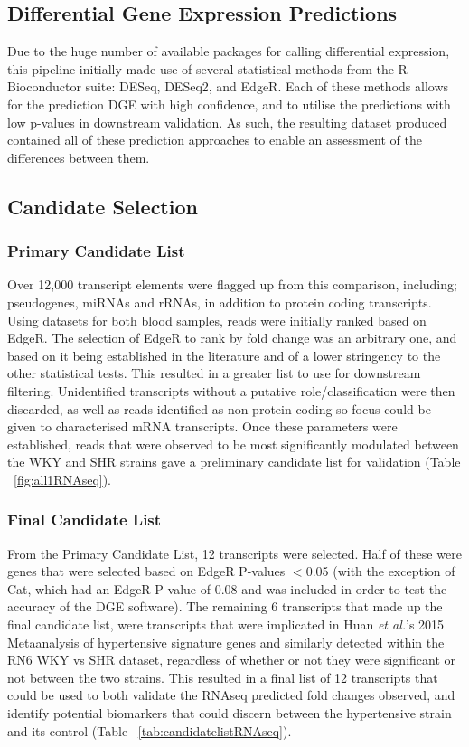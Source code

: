 \subsection{Differential Gene Expression Predictions}
Due to the huge number of available packages for calling differential expression, this pipeline initially made use of several statistical methods from the R Bioconductor suite: DESeq, DESeq2, and EdgeR. Each of these methods allows for the prediction DGE with high confidence, and to utilise the predictions with low p-values in downstream validation. As such, the resulting dataset produced contained all of these prediction approaches to enable an assessment of the differences between them.

\subsection{Candidate Selection}
\subsubsection{Primary Candidate List}
Over 12,000 transcript elements were flagged up from this comparison, including; pseudogenes, miRNAs and rRNAs, in addition to protein coding transcripts. Using datasets for both blood samples, reads were initially ranked based on EdgeR. The selection of EdgeR to rank by fold change was an arbitrary one, and based on it being established in the literature and of a lower stringency to the other statistical tests. This resulted in a greater list to use for downstream filtering. Unidentified transcripts without a putative role/classification were then discarded, as well as reads identified as non-protein coding so focus could be given to characterised mRNA transcripts. Once these parameters were established, reads that were observed to be most significantly modulated between the WKY and SHR strains gave a preliminary candidate list for validation (Table ~\ref{fig:all1RNAseq}).

\subsubsection{Final Candidate List}
From the Primary Candidate List, 12 transcripts were selected. Half of these were genes that were selected based on EdgeR P-values $<$0.05 (with the exception of Cat, which had an EdgeR P-value of 0.08 and was included in order to test the accuracy of the DGE software). The remaining 6 transcripts that made up the final candidate list, were transcripts that were implicated in Huan \textit{et al.}'s 2015 Metaanalysis of hypertensive signature genes and similarly detected within the RN6 WKY vs SHR dataset, regardless of whether or not they were significant or not between the two strains. This resulted in a final list of 12 transcripts that could be used to both validate the RNAseq predicted fold changes observed, and identify potential biomarkers that could discern between the hypertensive strain and its control (Table ~\ref{tab:candidatelistRNAseq}). 


